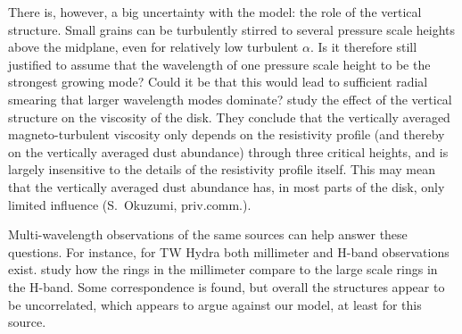 \documentclass{aa}
\newcommand{\revised}[1]{{#1}}
\begin{document}
\revised{There is, however, a big uncertainty with the model: the role of the vertical
structure. Small grains can be turbulently stirred to several pressure scale
heights above the midplane, even for relatively low turbulent $\alpha$. Is it
therefore still justified to assume that the wavelength of one pressure scale
height to be the strongest growing mode? Could it be that this would lead to
sufficient radial smearing that larger wavelength modes dominate?
\citet{2011ApJ...742...65O} study the effect of the vertical structure on the
viscosity of the disk. They conclude that the vertically averaged
magneto-turbulent viscosity only depends on the resistivity profile (and thereby
on the vertically averaged dust abundance) through three critical heights, and
is largely insensitive to the details of the resistivity profile itself. This may mean
that the vertically averaged dust abundance has, in most parts of the disk, only
limited influence (S.~Okuzumi, priv.comm.). }

Multi-wavelength
observations of the same sources can help answer these questions. For instance,
for TW Hydra both millimeter \citep{2016ApJ...820L..40A} and H-band observations
\citep{2017ApJ...837..132V} exist. \citet{2017ApJ...837..132V} study how the
rings in the millimeter compare to the large scale rings in the H-band. Some
correspondence is found, but overall the structures appear to be uncorrelated,
which appears to argue against our model, at least for this source.
\end{document}
